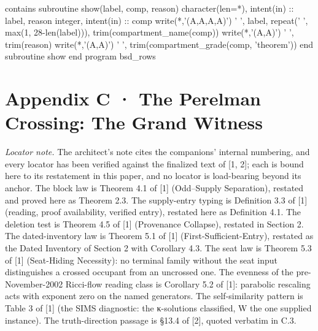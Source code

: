 \documentclass[10pt,twocolumn]{article}
\newenvironment{Shaded}{}{}
\newcommand{\BuiltInTok}[1]{#1}
\newcommand{\CommentTok}[1]{#1}
\newcommand{\DataTypeTok}[1]{#1}
\newcommand{\DecValTok}[1]{#1}
\newcommand{\FunctionTok}[1]{#1}
\newcommand{\KeywordTok}[1]{#1}
\newcommand{\NormalTok}[1]{#1}
\newcommand{\StringTok}[1]{#1}
\providecommand{\BuiltInTok}[1]{#1}
\providecommand{\CommentTok}[1]{#1}
\providecommand{\DataTypeTok}[1]{#1}
\providecommand{\DecValTok}[1]{#1}
\providecommand{\FunctionTok}[1]{#1}
\providecommand{\KeywordTok}[1]{#1}
\providecommand{\NormalTok}[1]{#1}
\providecommand{\StringTok}[1]{#1}
\providecommand{\textquotesingle}{'}
\providecommand{\BuiltInTok}[1]{#1}
\providecommand{\CommentTok}[1]{#1}
\providecommand{\DataTypeTok}[1]{#1}
\providecommand{\DecValTok}[1]{#1}
\providecommand{\FunctionTok}[1]{#1}
\providecommand{\KeywordTok}[1]{#1}
\providecommand{\NormalTok}[1]{#1}
\providecommand{\StringTok}[1]{#1}
\begin{document}
\begin{strip}
\begin{Shaded}
\begin{Highlighting}[]
\CommentTok{contains}
  \KeywordTok{subroutine}\NormalTok{ show(label, comp, reason)}
    \DataTypeTok{character(len=*)}\NormalTok{, }\DataTypeTok{intent(in)} \DataTypeTok{::}\NormalTok{ label, reason}
    \DataTypeTok{integer}\NormalTok{, }\DataTypeTok{intent(in)} \DataTypeTok{::}\NormalTok{ comp}
    \FunctionTok{write(*}\NormalTok{,}\StringTok{\textquotesingle{}(A,A,A,A)\textquotesingle{}}\FunctionTok{)} \StringTok{\textquotesingle{}   \textquotesingle{}}\NormalTok{, label, }\FunctionTok{repeat}\NormalTok{(}\StringTok{\textquotesingle{} \textquotesingle{}}\NormalTok{, }\BuiltInTok{max}\NormalTok{(}\DecValTok{1}\NormalTok{, }\DecValTok{28}\KeywordTok{{-}}\FunctionTok{len}\NormalTok{(label))}\CommentTok{), trim(compartment\_name(comp))}
    \FunctionTok{write(*}\NormalTok{,}\StringTok{\textquotesingle{}(A,A)\textquotesingle{}}\FunctionTok{)} \StringTok{\textquotesingle{}       \textquotesingle{}}\NormalTok{, }\FunctionTok{trim}\NormalTok{(reason)}
    \FunctionTok{write(*}\NormalTok{,}\StringTok{\textquotesingle{}(A,A)\textquotesingle{}}\FunctionTok{)} \StringTok{\textquotesingle{}       \textquotesingle{}}\NormalTok{, }\FunctionTok{trim}\NormalTok{(compartment\_grade(comp, }\StringTok{\textquotesingle{}theorem\textquotesingle{}}\NormalTok{))}
  \KeywordTok{end subroutine}\NormalTok{ show}
\KeywordTok{end program}\NormalTok{ bsd\_rows}
\end{Highlighting}
\end{Shaded}
\end{strip}

\section{Appendix C · The Perelman Crossing: The Grand
Witness}\label{appendix-c-the-perelman-crossing-the-grand-witness}

\emph{Locator note.} The architect's note cites the companions' internal
numbering, and every locator has been verified against the finalized
text of {[}1, 2{]}; each is bound here to its restatement in this paper,
and no locator is load-bearing beyond its anchor. The block law is
Theorem 4.1 of {[}1{]} (Odd--Supply Separation), restated and proved
here as Theorem 2.3. The supply-entry typing is Definition 3.3 of
{[}1{]} (reading, proof availability, verified entry), restated here as
Definition 4.1. The deletion test is Theorem 4.5 of {[}1{]} (Provenance
Collapse), restated in Section 2. The dated-inventory law is Theorem 5.1
of {[}1{]} (First-Sufficient-Entry), restated as the Dated Inventory of
Section 2 with Corollary 4.3. The seat law is Theorem 5.3 of {[}1{]}
(Seat-Hiding Necessity): no terminal family without the seat input
distinguishes a crossed occupant from an uncrossed one. The evenness of
the pre-November-2002 Ricci-flow reading class is Corollary 5.2 of
{[}1{]}: parabolic rescaling acts with exponent zero on the named
generators. The self-similarity pattern is Table 3 of {[}1{]} (the SIMS
diagnostic: the κ-solutions classified, W the one supplied instance).
The truth-direction passage is §13.4 of {[}2{]}, quoted verbatim in C.3.
\end{document}
